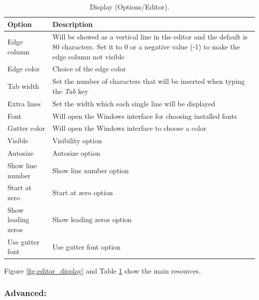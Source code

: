 \begin{table}
  \begin{footnotesize}
    \begin{tabularx}{\textwidth}{>{\hsize=0.3\hsize}X>{\hsize=0.7\hsize}X}\\
      \hline
      \textbf{Option} & \textbf{Description} \\
      \hline  %
      Edge column & Will be showed as a vertical line in the editor and the default is 80 characters.
      Set it to 0 or a negative value (-1) to make the edge column not visible \\
      Edge color & Choice of the edge color \\
      Tab width & Set the number of characters that will be inserted when typing the \textit{Tab} key \\
      Extra lines & Set the width which each single line will be displayed \\
      Font & Will open the Windows interface for choosing installed fonts \\
      \hline %
      Gutter color & Will open the Windows interface to choose a color \\
      Visible & Visibility option \\
      Autosize & Autosize option \\
      Show line number & Show line number option \\
      Start at zero & Start at zero option \\
      Show leading zeros & Show leading zeros option \\
      Use gutter font & Use gutter font option \\
      \hline
    \end{tabularx}
  \end{footnotesize}
  \caption{Display (Options/Editor).}
  \label{tab:editor_display}
\end{table}

Figure \ref{fig:editor_display} and
Table \ref{tab:editor_display}
show the main resources.

\hypertarget{working_editor_advanced}{}
\subsubsection{Advanced:}\\

